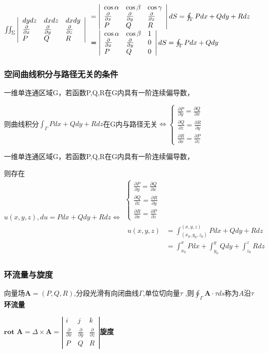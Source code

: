 \documentclass[UTF8]{ctexart}
\newcommand{\mb}[1]{\textbf{#1}}
\newcommand{\mf}[1]{\left( #1\right)}
\newcommand{\mfa}[1]{\left| #1\right|}
\newcommand{\q}{\quad}
\newcommand{\ma}[1]{\begin{array}{llll} #1 \end{array}}
\newcommand{\da}[2]{\frac{\partial #1}{\partial #2}}
\newcommand{\fcz}[1] {
    \left\{
        \begin{array}{llll} #1 \end{array}
    \right.
}
\newcommand{\meq}[2]{\xlongequal[#2]{#1}}
\begin{document}
$\iint_\Sigma \mfa{\ma{
    dydz &dxdz &dxdy\\
    \da{}{x}  &\da{}{y}  &\da{}{z}\\
    P &Q &R
}}\ma{=\mfa{\ma{
     \cos \alpha  & \cos \beta  &\cos \gamma\\
    \da{}{x}  &\da{}{y}  &\da{}{z}\\
    P &Q &R
}}dS=\oint_\Gamma Pdx +Qdy +Rdz\\
    \meq{}{} \mfa{\ma{
        \cos \alpha  & \cos \beta  &1\\
    \da{}{x}  &\da{}{y}  &0\\
    P &Q &0
    }}dS=\oint_\Gamma Pdx +Qdy 
}
$

\subsubsection{空间曲线积分与路径无关的条件}

一维单连通区域G，若函数P,Q,R在G内具有一阶连续偏导数，

\q \q 则曲线积分$\int_\Gamma Pdx+Qdy+Rdz$在G内与路径无关$\Leftrightarrow \fcz{
    \da{P}{y}=\da{Q}{x}\\
    \da{Q}{z}=\da{R}{y}\\
    \da{R}{x}=\da{P}{z}
}$


一维单连通区域G，若函数P,Q,R在G内具有一阶连续偏导数，

\q \q 则存在$u\mf{x,y,z},du=Pdx+Qdy+Rdz \Leftrightarrow \ma{ \fcz{
    \da{P}{y}=\da{Q}{x}\\
    \da{Q}{z}=\da{R}{y}\\
    \da{R}{x}=\da{P}{z}
}\\
    \ma{
        u\mf{x,y,z} &=\int_{\mf{x_0,y_0,z_0}}^{\mf{x,y,z}}Pdx+Qdy+Rdz\\
                     &=\int_{x_0}^{x}Pdx+\int_{y_0}^{y}Qdy+\int_{z_0}^{z}Rdz
    }
}$



\subsubsection{环流量与旋度}

向量场$\mb{A}=\mf{P,Q,R}$,分段光滑有向闭曲线$\Gamma$,单位切向量$\tau$ ,则$\oint_\Gamma \mb{A} \cdot \tau ds$称为$A$沿$\tau$\mb{环流量}


$\mb{rot A}=\Delta \times \mb{A}=\mfa{\ma{
    i &j &k\\
    \da{}{x} &\da{}{y} &\da{}{z} \\
    P &Q &R
}}$\mb{旋度}
\end{document}
